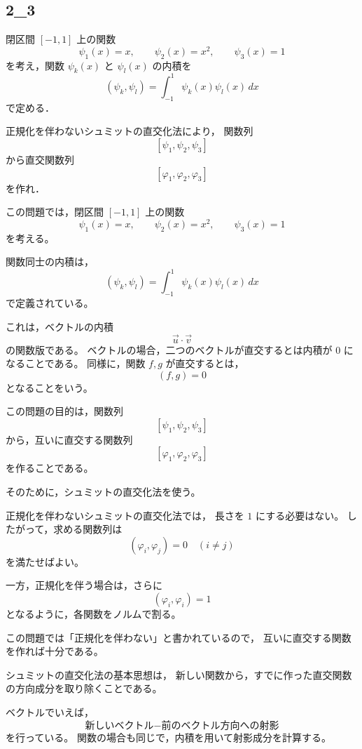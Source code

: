 \subsection{2_3}
\begin{exercise}
	閉区間 \([-1,1]\) 上の関数
	\[
	\psi_1(x)=x,\qquad
	\psi_2(x)=x^2,\qquad
	\psi_3(x)=1
	\]
	を考え，関数 \(\psi_k(x)\) と \(\psi_l(x)\) の内積を
	\[
	(\psi_k,\psi_l)
	=
	\int_{-1}^{1}\psi_k(x)\psi_l(x)\,dx
	\]
	で定める．
	
	正規化を伴わないシュミットの直交化法により，
	関数列
	\[
	[\psi_1,\psi_2,\psi_3]
	\]
	から直交関数列
	\[
	[\varphi_1,\varphi_2,\varphi_3]
	\]
	を作れ．
\end{exercise}
\begin{background}
	この問題では，閉区間 \([-1,1]\) 上の関数
	\[
	\psi_1(x)=x,\qquad
	\psi_2(x)=x^2,\qquad
	\psi_3(x)=1
	\]
	を考える。
	
	関数同士の内積は，
	\[
	(\psi_k,\psi_l)
	=
	\int_{-1}^{1}\psi_k(x)\psi_l(x)\,dx
	\]
	で定義されている。
	
	これは，ベクトルの内積
	\[
	\vec{u}\cdot \vec{v}
	\]
	の関数版である。
	ベクトルの場合，二つのベクトルが直交するとは内積が \(0\) になることである。
	同様に，関数 \(f,g\) が直交するとは，
	\[
	(f,g)=0
	\]
	となることをいう。
	
	この問題の目的は，関数列
	\[
	[\psi_1,\psi_2,\psi_3]
	\]
	から，互いに直交する関数列
	\[
	[\varphi_1,\varphi_2,\varphi_3]
	\]
	を作ることである。
	
	そのために，シュミットの直交化法を使う。
	
	正規化を伴わないシュミットの直交化法では，
	長さを \(1\) にする必要はない。
	したがって，求める関数列は
	\[
	(\varphi_i,\varphi_j)=0
	\quad (i\neq j)
	\]
	を満たせばよい。
	
	一方，正規化を伴う場合は，さらに
	\[
	(\varphi_i,\varphi_i)=1
	\]
	となるように，各関数をノルムで割る。
	
	この問題では「正規化を伴わない」と書かれているので，
	互いに直交する関数を作れば十分である。
	
	シュミットの直交化法の基本思想は，
	新しい関数から，すでに作った直交関数の方向成分を取り除くことである。
	
	ベクトルでいえば，
	\[
	\text{新しいベクトル}
	-
	\text{前のベクトル方向への射影}
	\]
	を行っている。
	関数の場合も同じで，内積を用いて射影成分を計算する。
\end{background}
